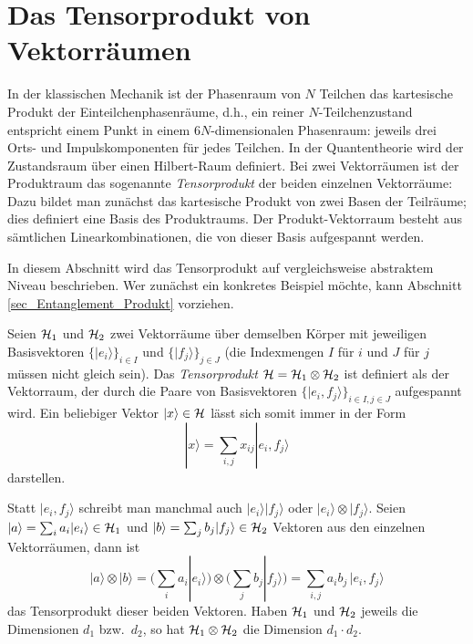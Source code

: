 \section{Das Tensorprodukt von Vektorr\"aumen}
\label{sec_Tensorprodukt}

In der klassischen Mechanik ist der Phasenraum von $N$
Teilchen das kartesische Produkt der Einteilchenphasenr\"aume,
d.h., ein reiner $N$-Teilchenzustand entspricht einem Punkt
in einem $6N$-dimensionalen Phasenraum: jeweils drei Orts-
und Impulskomponenten f\"ur jedes Teilchen.  
In der Quantentheorie wird der Zustandsraum \"uber
einen Hilbert-Raum definiert. Bei zwei Vektorr\"aumen 
ist der Produktraum das sogenannte 
{\em Tensorprodukt} der
beiden einzelnen Vektorr\"aume: Dazu bildet man zun\"achst das 
kartesische Produkt von zwei Basen der Teilr\"aume; dies
definiert eine Basis des Produktraums. Der Produkt-Vektorraum
besteht aus s\"amtlichen Linearkombinationen, die von
dieser Basis aufgespannt werden.

In diesem Abschnitt wird das Tensorprodukt auf vergleichsweise abstraktem
Niveau beschrieben. Wer zun\"achst ein konkretes Beispiel m\"ochte, kann
Abschnitt \ref{sec_Entanglement_Produkt} vorziehen.

Seien ${\cal H}_1$ und ${\cal H}_2$ zwei Vektorr\"aume \"uber demselben
K\"orper mit
jeweiligen Basisvektoren $\{|e_i\rangle \}_{i\in I}$ und $\{|f_j\rangle\}_{j\in J}$
(die Indexmengen $I$ f\"ur $i$ und $J$ f\"ur $j$ m\"ussen nicht gleich sein). 
Das {\em Tensorprodukt} ${\cal H}={\cal H}_1\otimes{\cal H}_2$
ist definiert als der Vektorraum, der durch die Paare von Basisvektoren
$\{ |e_i,f_j\rangle \}_{i\in I, j\in J}$ aufgespannt wird. Ein beliebiger Vektor 
$|x\rangle \in {\cal H}$ l\"asst sich somit immer in der Form
\begin{equation}
     |x \rangle = \sum_{i,j} x_{ij} |e_i,f_j\rangle 
\end{equation}
darstellen.

Statt $|e_i,f_j\rangle$ schreibt man 
manchmal auch $|e_i\rangle |f_j\rangle$
oder $|e_i\rangle \otimes |f_j\rangle$. Seien
$|a\rangle=\sum_i a_i |e_i\rangle \in {\cal H}_1$ 
und $|b\rangle = \sum_j b_j |f_j\rangle \in {\cal H}_2$ 
Vektoren aus den einzelnen Vektorr\"aumen, 
dann ist
\begin{equation}
     |a\rangle \otimes |b\rangle = \Big( \sum_i a_i |e_i\rangle \Big)
       \otimes \Big( \sum_j b_j | f_j\rangle \Big) =
       \sum_{i,j} a_i b_j \, |e_i, f_j\rangle
\end{equation}
das Tensorprodukt dieser beiden Vektoren.
Haben ${\cal H}_1$ und ${\cal H}_2$ jeweils die Dimensionen
$d_1$ bzw.\ $d_2$, so hat ${\cal H}_1\otimes {\cal H}_2$
die Dimension $d_1 \cdot d_2$. 


